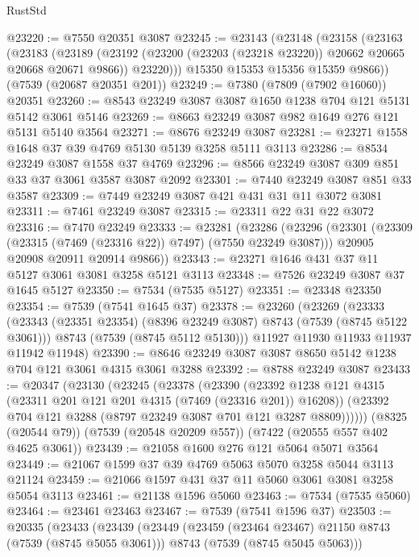 \begin{lexlean}{RustStd}
\begin{coremodule}
@23220 := @7550 @20351 @3087
@23245 := @23143
    (@23148
      (@23158
        (@23163
          (@23183
            (@23189
              (@23192 (@23200 (@23203 (@23218 @23220)) @20662 @20665 @20668 @20671 @9866))
              @23220)))
        @15350
        @15353
        @15356
        @15359
        @9866))
    (@7539 (@20687 @20351 @201))
@23249 := @7380 (@7809 (@7902 @16060)) @20351
@23260 := @8543 @23249 @3087 @3087 @1650 @1238 @704 @121 @5131 @5142 @3061 @5146
@23269 := @8663 @23249 @3087 @982 @1649 @276 @121 @5131 @5140 @3564
@23271 := @8676 @23249 @3087
@23281 := @23271 @1558 @1648 @37 @39 @4769 @5130 @5139 @3258 @5111 @3113
@23286 := @8534 @23249 @3087 @1558 @37 @4769
@23296 := @8566 @23249 @3087 @309 @851 @33 @37 @3061 @3587 @3087 @2092
@23301 := @7440 @23249 @3087 @851 @33 @3587
@23309 := @7449 @23249 @3087 @421 @431 @31 @11 @3072 @3081
@23311 := @7461 @23249 @3087
@23315 := @23311 @22 @31 @22 @3072
@23316 := @7470 @23249
@23333 := @23281
    (@23286
      (@23296
        (@23301 (@23309 (@23315 (@7469 (@23316 @22)) @7497) (@7550 @23249 @3087)))
        @20905
        @20908
        @20911
        @20914
        @9866))
@23343 := @23271 @1646 @431 @37 @11 @5127 @3061 @3081 @3258 @5121 @3113
@23348 := @7526 @23249 @3087 @37 @1645 @5127
@23350 := @7534 (@7535 @5127)
@23351 := @23348 @23350
@23354 := @7539 (@7541 @1645 @37)
@23378 := @23260
    (@23269
      (@23333
        (@23343 (@23351 @23354) (@8396 @23249 @3087) @8743 (@7539 (@8745 @5122 @3061)))
        @8743
        (@7539 (@8745 @5112 @5130)))
      @11927
      @11930
      @11933
      @11937
      @11942
      @11948)
@23390 := @8646 @23249 @3087 @3087 @8650 @5142 @1238 @704 @121 @3061 @4315 @3061 @3288
@23392 := @8788 @23249 @3087
@23433 := @20347
    (@23130
      (@23245
        (@23378
          (@23390
            (@23392 @1238 @121 @4315 (@23311 @201 @121 @201 @4315 (@7469 (@23316 @201)) @16208))
            (@23392 @704 @121 @3288 (@8797 @23249 @3087 @701 @121 @3287 @8809))))))
    (@8325 (@20544 @79))
    (@7539 (@20548 @20209 @557))
    (@7422 (@20555 @557 @402 @4625 @3061))
@23439 := @21058 @1600 @276 @121 @5064 @5071 @3564
@23449 := @21067 @1599 @37 @39 @4769 @5063 @5070 @3258 @5044 @3113 @21124
@23459 := @21066 @1597 @431 @37 @11 @5060 @3061 @3081 @3258 @5054 @3113
@23461 := @21138 @1596 @5060
@23463 := @7534 (@7535 @5060)
@23464 := @23461 @23463
@23467 := @7539 (@7541 @1596 @37)
@23503 := @20335
    (@23433
      (@23439
        (@23449
          (@23459 (@23464 @23467) @21150 @8743 (@7539 (@8745 @5055 @3061)))
          @8743
          (@7539 (@8745 @5045 @5063)))

\end{coremodule}
\end{lexlean}
